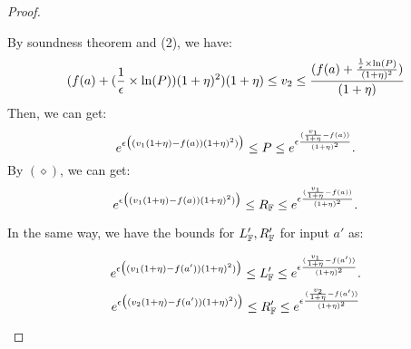\documentclass[a4paper,11pt]{article}
\begin{document}
\begin{proof}
\begin{itemize}
{	
}
%
%
		By soundness theorem and (2), we have:
		\[
		(f(a) + 
				(\frac{1}{\epsilon} \times \ln(P))
				(1 + \eta)^2)
				{(1 + \eta)}
		\leq v_2 \leq
			\frac{(
				f(a) + \frac{\frac{1}{\epsilon} 
				\times \ln(P)}
				{(1 + \eta)^2}
				)}
				{(1 + \eta)}		
		\]
		Then, we can get:
		\\ 
		$$
		e^{\epsilon 
		\big( (v_1(1 + \eta) - f(a)) (1 + \eta)^2) \big)}
		\leq
		P
		\leq
		e^{\epsilon 
		\frac{(\frac{v_1}{1 + \eta} - f(a))}{(1 + \eta)^2}}.$$
		By $(\diamond)$, we can get:
		\\ 
		$$
		e^{\epsilon 
		\big( (v_1(1 + \eta) - f(a)) (1 + \eta)^2) \big)}
		\leq
		R_{\mathbb{F}}
		\leq
		e^{\epsilon 
		\frac{(\frac{v_1}{1 + \eta} - f(a))}{(1 + \eta)^2}}.$$		

		In the same way, we have the bounds for $L_{\mathbb{F}}', R_{\mathbb{F}}'$ for input $a'$ as:

		$$e^{\epsilon 
				\big( (v_1(1 + \eta) - f(a')) (1 + \eta)^2) \big)}
		\leq L_{\mathbb{F}}' \leq
		e^{\epsilon 
				\frac{(\frac{v_1}{1 + \eta} - f(a'))}{(1 + \eta)^2}}.$$
		$$ 
		e^{\epsilon 
				\big( (v_2(1 + \eta) - f(a')) (1 + \eta)^2) \big)}
		\leq R_{\mathbb{F}}' \leq
		e^{\epsilon 
				\frac{(\frac{v_2}{1 + \eta} - f(a'))}{(1 + \eta)^2}}$$


\end{itemize}
\end{proof}
\end{document}

